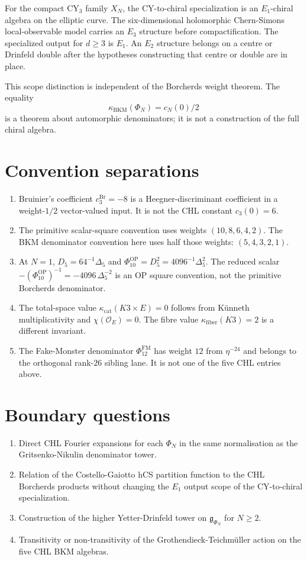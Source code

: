 \documentclass[11pt]{article}
\providecommand{\kBKM}{\kappa_{\mathrm{BKM}}}
\providecommand{\kcat}{\kappa_{\mathrm{cat}}}
\providecommand{\kfib}{\kappa_{\mathrm{fiber}}}
\providecommand{\fg}{\mathfrak{g}}
\providecommand{\DeltaFive}{\Delta_5}
\providecommand{\Dfive}{D_5}
\providecommand{\PhiOP}{\Phi_{10}^{\mathrm{OP}}}
\begin{document}
For the compact CY$_3$ family $X_N$, the CY-to-chiral specialization is
an $E_1$-chiral algebra on the elliptic curve. The six-dimensional
holomorphic Chern-Simons local-observable model carries an $E_3$
structure before compactification. The specialized output for
$d\geq3$ is $E_1$. An $E_2$ structure belongs on a centre or
Drinfeld double after the hypotheses constructing that centre or double
are in place.

This scope distinction is independent of the Borcherds weight theorem.
The equality
\[
  \kBKM(\Phi_N)=c_N(0)/2
\]
is a theorem about automorphic denominators; it is not a construction
of the full chiral algebra.

\section{Convention separations}
\label{sec:convention-separations}

\begin{enumerate}
\item Bruinier's coefficient $c_3^{\mathrm{Br}}=-8$ is a
Heegner-discriminant coefficient in a weight-$1/2$ vector-valued input.
It is not the CHL constant $c_3(0)=6$.
\item The primitive scalar-square convention uses weights
$(10,8,6,4,2)$. The BKM denominator convention here uses half those weights:
$(5,4,3,2,1)$.
\item At $N=1$, $\Dfive=64^{-1}\DeltaFive$ and
$\PhiOP=\Dfive^2=4096^{-1}\DeltaFive^2$. The reduced scalar
$-(\PhiOP)^{-1}=-4096\,\DeltaFive^{-2}$ is an OP square convention,
not the primitive Borcherds denominator.
\item The total-space value $\kcat(K3\times E)=0$ follows from
K\"unneth multiplicativity and $\chi(\mathcal O_E)=0$. The fibre value
$\kfib(K3)=2$ is a different invariant.
\item The Fake-Monster denominator $\Phi_{12}^{\mathrm{FM}}$ has
weight $12$ from $\eta^{-24}$ and belongs to the orthogonal
rank-$26$ sibling lane. It is not one of the five CHL entries above.
\end{enumerate}

\section{Boundary questions}
\label{sec:boundary-questions}

\begin{enumerate}
\item Direct CHL Fourier expansions for each $\Phi_N$ in the same
normalisation as the Gritsenko-Nikulin denominator tower.
\item Relation of the Costello-Gaiotto hCS partition function to the CHL
Borcherds products without changing the $E_1$ output scope of the
CY-to-chiral specialization.
\item Construction of the higher Yetter-Drinfeld tower on
$\fg_{\Phi_N}$ for $N\geq2$.
\item Transitivity or non-transitivity of the Grothendieck-Teichm\"uller
action on the five CHL BKM algebras.
\end{enumerate}
\end{document}
